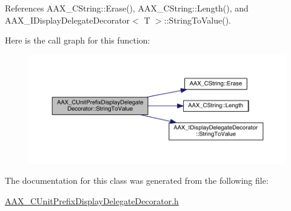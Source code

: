 References A\+A\+X\+\_\+\+C\+String\+::\+Erase(), A\+A\+X\+\_\+\+C\+String\+::\+Length(), and A\+A\+X\+\_\+\+I\+Display\+Delegate\+Decorator$<$ T $>$\+::\+String\+To\+Value().



Here is the call graph for this function\+:
\nopagebreak
\begin{figure}[H]
\begin{center}
\leavevmode
\includegraphics[width=350pt]{a00046_a6d930afe0a249f6936504c25d9c29764_cgraph}
\end{center}
\end{figure}




The documentation for this class was generated from the following file\+:\begin{DoxyCompactItemize}
\item 
\hyperlink{a00200}{A\+A\+X\+\_\+\+C\+Unit\+Prefix\+Display\+Delegate\+Decorator.\+h}\end{DoxyCompactItemize}
